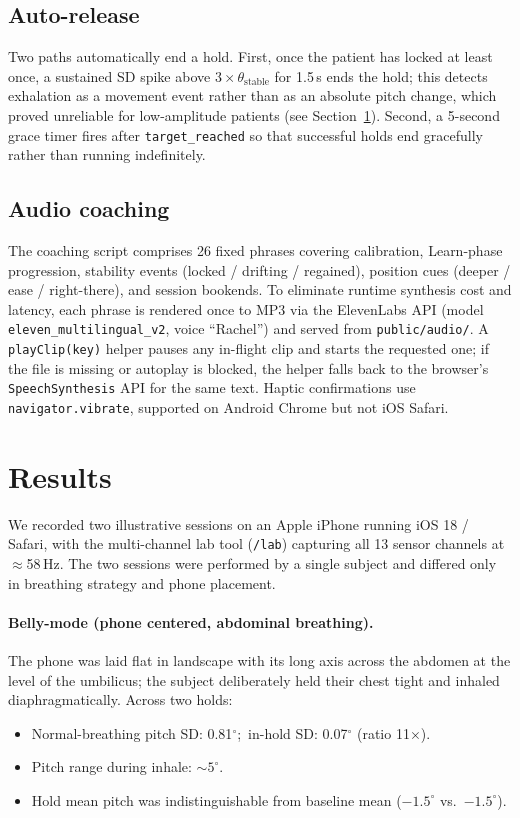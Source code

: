 \documentclass[3p,times]{elsarticle}
\begin{document}
\subsection{Auto-release}

Two paths automatically end a hold. First, once the patient has
locked at least once, a sustained SD spike above
$3\times\theta_{\text{stable}}$ for 1.5\,s ends the hold; this
detects exhalation as a movement event rather than as an absolute
pitch change, which proved unreliable for low-amplitude patients
(see Section~\ref{sec:results}). Second, a 5-second grace timer
fires after \texttt{target\_reached} so that successful holds end
gracefully rather than running indefinitely.

\subsection{Audio coaching}

The coaching script comprises 26 fixed phrases covering
calibration, Learn-phase progression, stability events
(locked / drifting / regained), position cues
(deeper / ease / right-there), and session bookends. To eliminate
runtime synthesis cost and latency, each phrase is rendered once
to MP3 via the ElevenLabs API (model
\texttt{eleven\_multilingual\_v2}, voice ``Rachel'') and served
from \texttt{public/audio/}. A \texttt{playClip(key)} helper pauses
any in-flight clip and starts the requested one; if the file is
missing or autoplay is blocked, the helper falls back to the
browser's \texttt{SpeechSynthesis} API for the same text. Haptic
confirmations use \texttt{navigator.vibrate}, supported on Android
Chrome but not iOS Safari.

\section{Results}\label{sec:results}

We recorded two illustrative sessions on an Apple iPhone running
iOS 18 / Safari, with the multi-channel lab tool
(\texttt{/lab}) capturing all 13 sensor channels at $\approx$58\,Hz.
The two sessions were performed by a single subject and differed
only in breathing strategy and phone placement.

\paragraph{Belly-mode (phone centered, abdominal breathing).}
The phone was laid flat in landscape with its long axis across the
abdomen at the level of the umbilicus; the subject deliberately
held their chest tight and inhaled diaphragmatically. Across two
holds:
\begin{itemize}
  \item Normal-breathing pitch SD: 0.81$^{\circ}$;\, in-hold SD: 0.07$^{\circ}$ (ratio 11$\times$).
  \item Pitch range during inhale: $\sim\!5^{\circ}$.
  \item Hold mean pitch was indistinguishable from baseline mean ($-1.5^{\circ}$ vs.\ $-1.5^{\circ}$).
\end{itemize}
\end{document}
